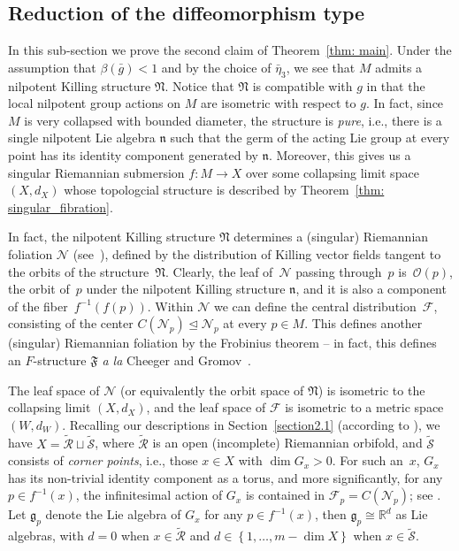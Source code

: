 \documentclass[10pt,a4paper]{amsart}
\numberwithin{equation}{section}
\begin{document}
\subsection{Reduction of the diffeomorphism type}\label{section5.2}
In this sub-section we prove the second claim of Theorem~\ref{thm: main}.
Under the assumption that $\beta(\bar{g})<1$ and by the choice of
$\bar{\eta}_3$, we see that $M$ admits a nilpotent Killing structure
$\mathfrak{N}$. Notice that $\mathfrak{N}$ is compatible with $g$ in that
the local nilpotent group actions on $M$ are isometric with respect to $g$. In
fact, since $M$ is very collapsed with bounded diameter, the structure is
\emph{pure}, i.e., there is a single nilpotent Lie algebra $\mathfrak{n}$ such
that the germ of the acting Lie group at every point has its identity component
generated by $\mathfrak{n}$. Moreover, this gives us a singular Riemannian
submersion $f\colon M\to X$ over some collapsing limit space~$(X,d_X)$ whose
topologcial structure is described by Theorem~\ref{thm: singular_fibration}.

In fact, the nilpotent Killing structure $\mathfrak{N}$ determines a (singular)
Riemannian foliation $\mathcal{N}$ (see~\cite{Molino88}), defined by the
distribution of Killing vector fields tangent to the orbits of the structure~$\mathfrak{N}$. Clearly, the leaf of~$\mathcal{N}$ passing through~$p$ is~$\mathcal{O}(p)$, the orbit of~$p$ under the nilpotent Killing structure
$\mathfrak{n}$, and it is also a component of the fiber~$f^{-1}(f(p))$. Within
$\mathcal{N}$ we can define the central distribution~$\mathcal{F}$, consisting
of the center $C(\mathcal{N}_p)\trianglelefteq \mathcal{N}_p$ at every $p\in
M$. This defines another (singular) Riemannian foliation by the Frobinius
theorem -- in fact, this defines an $F$-structure $\mathfrak{F}$ \emph{a la}
Cheeger and Gromov~\cite{CGI, CGII}.

The leaf space of $\mathcal{N}$ (or equivalently the orbit space of
$\mathfrak{N}$) is isometric to the collapsing limit $(X,d_X)$, and the
leaf space of $\mathcal{F}$ is isometric to a metric space $(W,d_W)$. Recalling
our descriptions in Section~\ref{section2.1} (according to \cite[Theorem~0.5]{Fukaya88}), we have
$X=\tilde{\mathcal{R}}\sqcup \tilde{\mathcal{S}}$, where $\tilde{\mathcal{R}}$
is an open (incomplete) Riemannian orbifold, and $\tilde{\mathcal{S}}$ consists
of \emph{corner points}, i.e., those $x\in X$ with $\dim G_x>0$. For such an~$x$,
 $G_x$ has its non-trivial identity component as a torus, and more
 significantly, for any $p\in f^{-1}(x)$, the infinitesimal action of $G_x$ is
 contained in $\mathcal{F}_p=C(\mathcal{N}_p)$; see \cite[Lemma~5.1]{Fukaya88}.
 Let $\mathfrak{g}_p$ denote the Lie algebra of $G_x$ for any $p\in f^{-1}(x)$,
 then $\mathfrak{g}_p\cong \mathbb{R}^d$ as Lie algebras, with $d=0$ when $x\in
 \tilde{\mathcal{R}}$ and $d\in \left\{1,\ldots,m-\dim X\right\}$ when $x\in
 \tilde{\mathcal{S}}$.
\end{document}
